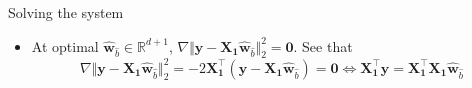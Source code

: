 \documentclass{beamer}
\numberwithin{equation}{section}
\begin{document}
\begin{frame}{Solving the system}
    \begin{itemize}
        \item
        At optimal $ \hat{\mathbf{w}}_{\hat{b}} \in \mathbb{R}^{d + 1} $,
        $ \nabla \Vert\mathbf{y} - \mathbf{X}_\mathbf{1}
        \hat{\mathbf{w}}_{\hat{b}}\Vert_2^2 = \mathbf{0} $. See that
        \begin{equation*}
            \nabla\Vert\mathbf{y} -
            \mathbf{X}_\mathbf{1}\hat{\mathbf{w}}_{\hat{b}}\Vert_2^2 =
            -2\mathbf{X}_\mathbf{1}^\top(\mathbf{y} -
            \mathbf{X}_\mathbf{1}\hat{\mathbf{w}}_{\hat{b}}) = \mathbf{0}
            \Leftrightarrow \mathbf{X}_\mathbf{1}^\top\mathbf{y} =
            \mathbf{X}_\mathbf{1}^\top\mathbf{X}_\mathbf{1}
            \hat{\mathbf{w}}_{\hat{b}}
        \end{equation*}


\end{itemize}
\end{frame}
\end{document}
